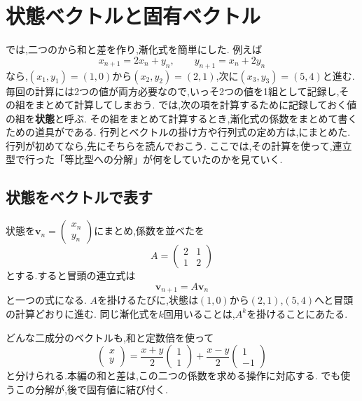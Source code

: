 
\section{状態ベクトルと固有ベクトル}\label{節：行列の基本}

では,二つのから和と差を作り,漸化式を簡単にした.
例えば
\[
  x_{n+1}=2x_n+y_n,\qquad y_{n+1}=x_n+2y_n
\]
なら,$(x_1,y_1)=(1,0)$から$(x_2,y_2)=(2,1)$,次に$(x_3,y_3)=(5,4)$と進む.
毎回の計算には2つの値が両方必要なので,いっそ2つの値を1組として記録し,その組をまとめて計算してしまおう.
では,次の項を計算するために記録しておく値の組を\textbf{状態}と呼ぶ.
その組をまとめて計算するとき,漸化式の係数をまとめて書くための道具がである.
行列とベクトルの掛け方や行列式の定め方は,にまとめた.行列が初めてなら,先にそちらを読んでおこう.
ここでは,その計算を使って,連立型で行った「等比型への分解」が何をしていたのかを見ていく.

\subsection{状態をベクトルで表す}

状態を$\boldsymbol v_n=\begin{pmatrix}x_n\\y_n\end{pmatrix}$にまとめ,係数を並べたを
\[
  A=\begin{pmatrix}2&1\\1&2\end{pmatrix}
\]
とする.すると冒頭の連立式は
\[
  \boldsymbol v_{n+1}=A\boldsymbol v_n
\]
と一つの式になる.
$A$を掛けるたびに,状態は$(1,0)$から$(2,1)$,$(5,4)$へと冒頭の計算どおりに進む.
同じ漸化式を$k$回用いることは,$A^k$を掛けることにあたる.

どんな二成分のベクトルも,和と定数倍を使って
\[
  \begin{pmatrix}x\\y\end{pmatrix}
  =\frac{x+y}{2}\begin{pmatrix}1\\1\end{pmatrix}
  +\frac{x-y}{2}\begin{pmatrix}1\\-1\end{pmatrix}
\]
と分けられる.本編の和と差は,この二つの係数を求める操作に対応する.
でも使うこの分解が,後で固有値に結び付く.

